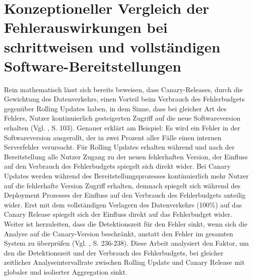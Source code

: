 \documentclass[
12pt,
a4paper,
twoside,
openright
]{report}
\begin{document}
	\section{Konzeptioneller Vergleich der Fehlerauswirkungen bei schrittweisen und vollständigen Software-Bereitstellungen}
	Rein mathematisch lässt sich bereits beweisen, dass Canary-Releases, durch die Gewichtung des Datenverkehrs, einen Vorteil beim Verbrauch des Fehlerbudgets gegenüber Rolling Updates haben, in dem Sinne, dass bei gleicher Art des Fehlers, Nutzer kontinuierlich gesteigerten Zugriff auf die neue Softwareversion erhalten (Vgl. \parencite{KhandeCan}, S. 103). Genauer erklärt am Beispiel: Es wird ein Fehler in der Softwareversion ausgerollt, der in zwei Prozent aller Fälle einen internen Serverfehler verursacht. Für Rolling Updates erhalten während und nach der Bereitstellung alle Nutzer Zugang zu der neuen fehlerhaften Version, der Einfluss auf den Verbrauch des Fehlerbudgets spiegelt sich direkt wider. Bei Canary Updates werden während des Bereitstellungsprozesses kontinuierlich mehr Nutzer auf die fehlerhafte Version Zugriff erhalten, demnach spiegelt sich während des Deployment Prozesses der Einfluss auf den Verbrauch des Fehlerbudgets anteilig wider. Erst mit dem vollständigen Verlagern des Datenverkehrs (100\%) auf das Canary Release spiegelt sich der Einfluss direkt auf das Fehlerbudget wider. Weiter ist herzuleiten, dass die Detektionszeit für den Fehler sinkt, wenn sich die Analyse auf die Canary-Version beschränkt, anstatt den Fehler im gesamten System zu überprüfen (Vgl. \parencite{islam2024predictive}, S. 236-238). Diese Arbeit analysiert den Faktor, um den die Detektionszeit und der Verbrauch des Fehlerbudgets, bei gleicher zeitlicher Analyseintervallrate zwischen Rolling Update und Canary Release mit globaler und isolierter Aggregation sinkt.
	
\end{document}
